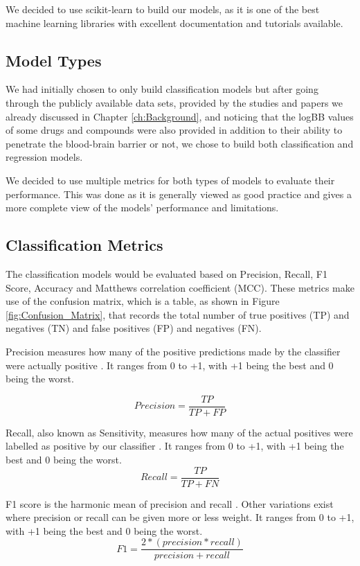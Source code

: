 We decided to use scikit-learn \citep{scikit-learn} to build our models, as it is one of the best machine learning libraries with excellent documentation and tutorials available. 

\subsection{Model Types}
\label{subsec:Model_Types}

We had initially chosen to only build classification models but after going through the publicly available data sets, provided by the studies and papers we already discussed in Chapter \ref{ch:Background}, and noticing that the logBB values of some drugs and compounds were also provided in addition to their ability to penetrate the blood-brain barrier or not, we chose to build both classification and regression models.

We decided to use multiple metrics for both types of models to evaluate their performance. This was done as it is generally viewed as good practice and gives a more complete view of the models' performance and limitations. 

\subsection{Classification Metrics}

The classification models would be evaluated based on Precision, Recall, F1 Score, Accuracy and Matthews correlation coefficient (MCC). These metrics make use of the confusion matrix, which is a table, as shown in Figure \ref{fig:Confusion_Matrix}, that records the total number of true positives (TP) and negatives (TN) and false positives (FP) and negatives (FN).

Precision measures how many of the positive predictions made by the classifier were actually positive \citep{Precision}. It ranges from 0 to +1, with +1 being the best and 0 being the worst.

$$Precision =  \frac{TP}{TP + FP}$$

Recall, also known as Sensitivity, measures how many of the actual positives were labelled as positive by our classifier \citep{Recall}. It ranges from 0 to +1, with +1 being the best and 0 being the worst.
$$Recall = \frac{TP}{TP + FN}$$

F1 score is the harmonic mean of precision and recall \citep{F1}. Other variations exist where precision or recall can be given more or less weight. It ranges from 0 to +1, with +1 being the best and 0 being the worst.
$$F1 = \frac{2 * (precision * recall)}{precision + recall}$$
\label{itm:F1}

